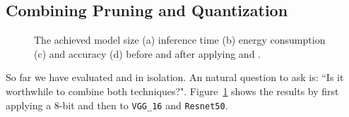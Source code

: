 \subsection{Combining Pruning and Quantization\label{sec:combin}}

\begin{figure}[!t]
\centering
{}
\hfill
{}
\hfill
{}
\hfill
{}
\hfill
\caption{The achieved model size (a) inference time (b) energy consumption (c) and accuracy (d) before and after applying \quantization and \pruning.
}
\label{fig:combine}
\end{figure}

So far we have evaluated \pruning and \quantization in isolation. An natural question to ask is: ``Is it worthwhile to combine both
techniques?". Figure~\ref{fig:combine} shows the results by first applying a 8-bit \dquantization and then \pruning to \texttt{VGG\_16} and
\texttt{Resnet50}.


